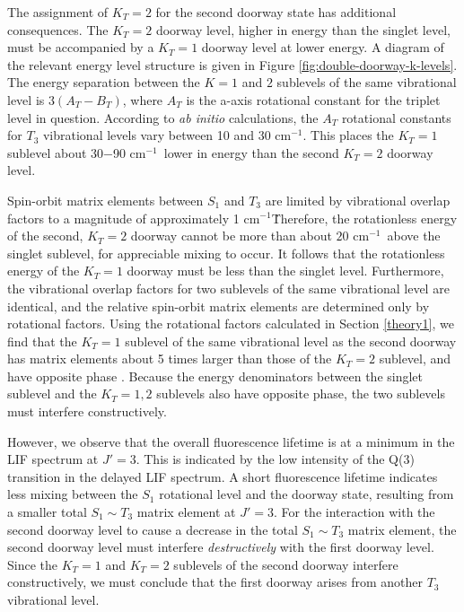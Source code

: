 \documentclass[12pt]{mitthesis}
\newcommand{\rcm}{cm$^{-1}$}
\begin{document}
The assignment of $K_T=2$ for the second doorway state has additional
consequences.  The $K_T=2$ doorway level, higher in energy than the
singlet level, must be accompanied by a $K_T=1$ doorway level at lower
energy.  A diagram of the relevant energy level structure is given in
Figure \ref{fig:double-doorway-k-levels}. The energy separation
between the $K=1$ and $2$ sublevels of the same vibrational level is
$3(A_T-B_T)$, where $A_T$ is the a-axis rotational constant for the
triplet level in question.  According to \emph{ab initio}
calculations, the $A_T$ rotational constants for $T_3$ vibrational
levels vary between 10 and 30 \rcm \cite{thom07}.  This places the
$K_T=1$ sublevel about 30$-$90 \rcm\ lower in energy than the second
$K_T=2$ doorway level.

Spin-orbit matrix elements between $S_1$ and $T_3$ are limited by
vibrational overlap factors to a magnitude of approximately 1 \rcm\.
Therefore, the rotationless energy of the second, $K_T=2$ doorway
cannot be more than about $20$ \rcm\ above the singlet sublevel, for
appreciable mixing to occur.  It follows that the rotationless energy
of the $K_T=1$ doorway must be less than the singlet level.
Furthermore, the vibrational overlap factors for two sublevels of the
same vibrational level are identical, and the relative spin-orbit
matrix elements are determined only by rotational factors.  Using the
rotational factors calculated in Section \ref{theory1}, we find that
the $K_T=1$ sublevel of the same vibrational level as the second
doorway has matrix elements about 5 times larger than those of the
$K_T=2$ sublevel, and have opposite phase \cite{stevens73}.  Because
the energy denominators between the singlet sublevel and the $K_T=1,2$
sublevels also have opposite phase, the two sublevels must interfere
constructively.

However, we observe that the overall fluorescence lifetime is at a
minimum in the LIF spectrum at $J'=3$.  This is indicated by the low
intensity of the Q(3) transition in the delayed LIF spectrum.  A short
fluorescence lifetime indicates less mixing between the $S_1$
rotational level and the doorway state, resulting from a smaller total
$S_1 \sim T_3$ matrix element at $J'=3$.  For the interaction with the
second doorway level to cause a decrease in the total $S_1 \sim T_3$
matrix element, the second doorway level must interfere
\emph{destructively} with the first doorway level.  Since the $K_T=1$
and $K_T=2$ sublevels of the second doorway interfere constructively,
we must conclude that the first doorway arises from another $T_3$
vibrational level.
\end{document}

